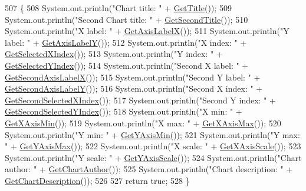 \begin{DoxyCode}
507                                 \{
508         System.out.println(\textcolor{stringliteral}{"Chart title: "} + \hyperlink{class_data_attribute_ade9747a192ba22fe1020e874bff6a48c}{GetTitle}());
509         System.out.println(\textcolor{stringliteral}{"Second Chart title: "} + \hyperlink{class_data_attribute_a4079522c93025fce7569eaed585f4aeb}{GetSecondTitle}());
510         System.out.println(\textcolor{stringliteral}{"X label: "} + \hyperlink{class_data_attribute_aecb451704a87d77dd80dbad8a19099d1}{GetAxisLabelX}());
511         System.out.println(\textcolor{stringliteral}{"Y label: "} + \hyperlink{class_data_attribute_af5f68794cd0195d42135d5e48120ccc0}{GetAxisLabelY}());
512         System.out.println(\textcolor{stringliteral}{"X index: "} + \hyperlink{class_data_attribute_a0f4a54973bc44b0526f78bda945dc81b}{GetSelectedXIndex}());
513         System.out.println(\textcolor{stringliteral}{"Y index: "} + \hyperlink{class_data_attribute_a82e7519853d9f470ea183dd0c39a03d6}{GetSelectedYIndex}());
514         System.out.println(\textcolor{stringliteral}{"Second X label: "} + \hyperlink{class_data_attribute_a8ace4cb1fee9e2abeabe3efc9a190c8f}{GetSecondAxisLabelX}());
515         System.out.println(\textcolor{stringliteral}{"Second Y label: "} + \hyperlink{class_data_attribute_a6efb7e067317898feefbbf6bd472b998}{GetSecondAxisLabelY}());
516         System.out.println(\textcolor{stringliteral}{"Second X index: "} + \hyperlink{class_data_attribute_a7f501790eee650ddf9ac17c4f63a3995}{GetSecondSelectedXIndex}());
517         System.out.println(\textcolor{stringliteral}{"Second Y index: "} + \hyperlink{class_data_attribute_a6f61ad05915f4aa31ad3dba00596da64}{GetSecondSelectedYIndex}());
518         System.out.println(\textcolor{stringliteral}{"X min: "} + \hyperlink{class_data_attribute_afa9da883abc4abad5f64c045de114c50}{GetXAxisMin}());
519         System.out.println(\textcolor{stringliteral}{"X max: "} + \hyperlink{class_data_attribute_ada370712422c7cbd21b7be4a0d88caf7}{GetXAxisMax}());
520         System.out.println(\textcolor{stringliteral}{"Y min: "} + \hyperlink{class_data_attribute_af0786b4de674874c0bb8ca9dbe1519c6}{GetYAxisMin}());
521         System.out.println(\textcolor{stringliteral}{"Y max: "} + \hyperlink{class_data_attribute_a81243eb8f7008e05e74b0f3571d2f08d}{GetYAxisMax}());
522         System.out.println(\textcolor{stringliteral}{"X scale: "} + \hyperlink{class_data_attribute_a5a1de25600487aa958a19ce01151fea4}{GetXAxisScale}());
523         System.out.println(\textcolor{stringliteral}{"Y scale: "} + \hyperlink{class_data_attribute_a95259727ce91efc0e0eaa28487d944c5}{GetYAxisScale}());
524         System.out.println(\textcolor{stringliteral}{"Chart author: "} + \hyperlink{class_data_attribute_acf40162cb874e55d17f0818280e8fe5c}{GetChartAuthor}());
525         System.out.println(\textcolor{stringliteral}{"Chart description: "} + \hyperlink{class_data_attribute_a13309a8abaa25bf9796c2668618ad8a7}{GetChartDescription}());
526         
527         \textcolor{keywordflow}{return} \textcolor{keyword}{true};
528     \}
\end{DoxyCode}
